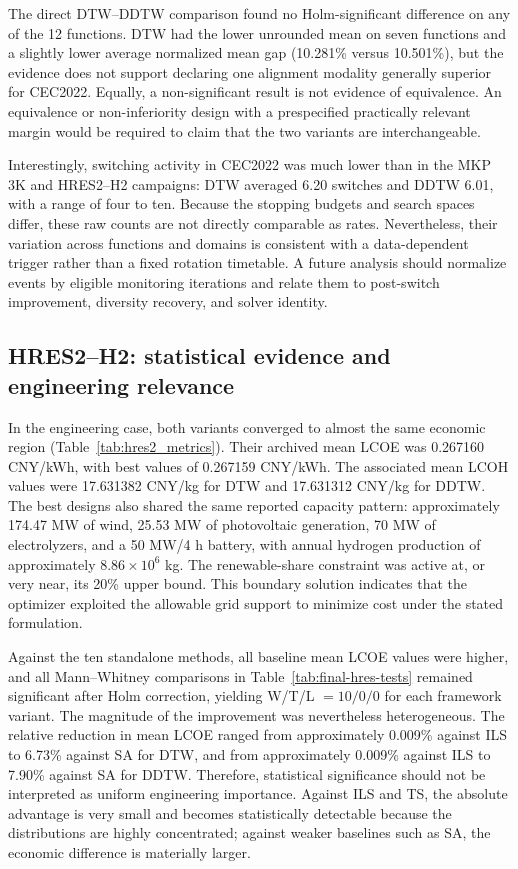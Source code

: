 The direct DTW--DDTW comparison found no Holm-significant difference on any of
the 12 functions. DTW had the lower unrounded mean on seven functions and a
slightly lower average normalized mean gap (10.281\% versus 10.501\%), but the
evidence does not support declaring one alignment modality generally superior
for CEC2022. Equally, a non-significant result is not evidence of equivalence.
An equivalence or non-inferiority design with a prespecified practically
relevant margin would be required to claim that the two variants are
interchangeable.

Interestingly, switching activity in CEC2022 was much lower than in the MKP
3K and HRES2--H2 campaigns: DTW averaged 6.20 switches and DDTW 6.01, with a
range of four to ten. Because the stopping budgets and search spaces differ,
these raw counts are not directly comparable as rates. Nevertheless, their
variation across functions and domains is consistent with a data-dependent
trigger rather than a fixed rotation timetable. A future analysis should
normalize events by eligible monitoring iterations and relate them to
post-switch improvement, diversity recovery, and solver identity.

\subsection{HRES2--H2: statistical evidence and engineering relevance}
\label{sec:discussion-hres2}

In the engineering case, both variants converged to almost the same economic
region (Table~\ref{tab:hres2_metrics}). Their archived mean LCOE was 0.267160 CNY/kWh, with best values of
0.267159 CNY/kWh. The associated mean LCOH values were 17.631382 CNY/kg for DTW
and 17.631312 CNY/kg for DDTW. The best designs also shared the same reported
capacity pattern: approximately 174.47 MW of wind, 25.53 MW of photovoltaic
generation, 70 MW of electrolyzers, and a 50 MW/4 h battery, with annual
hydrogen production of approximately $8.86\times10^6$ kg. The renewable-share
constraint was active at, or very near, its 20\% upper bound. This boundary
solution indicates that the optimizer exploited the allowable grid support to
minimize cost under the stated formulation.

Against the ten standalone methods, all baseline mean LCOE values were higher,
and all Mann--Whitney comparisons in Table~\ref{tab:final-hres-tests} remained significant after Holm correction,
yielding W/T/L $=10/0/0$ for each framework variant. The magnitude of the
improvement was nevertheless heterogeneous. The relative reduction in mean
LCOE ranged from approximately 0.009\% against ILS to 6.73\% against SA for
DTW, and from approximately 0.009\% against ILS to 7.90\% against SA for
DDTW. Therefore, statistical significance should not be interpreted as uniform
engineering importance. Against ILS and TS, the absolute advantage is very
small and becomes statistically detectable because the distributions are
highly concentrated; against weaker baselines such as SA, the economic
difference is materially larger.

